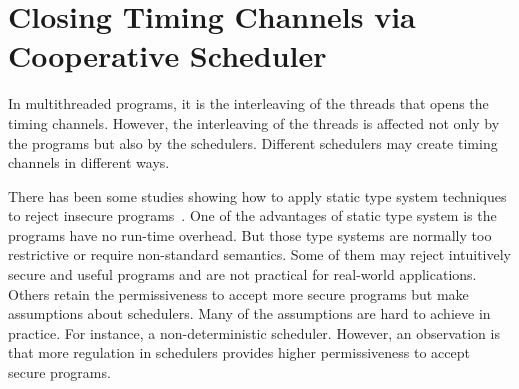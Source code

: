 \documentclass[a4paper]{report}
\newcommand{\co}[1]{$\cod{#1}$}
\begin{document}

\section{Closing Timing Channels via Cooperative Scheduler}
In multithreaded programs, it is the interleaving of the threads that opens the timing channels. 
However, the interleaving of the threads is affected not only by the programs but also by the schedulers.
Different schedulers may create timing channels in different ways.

There has been some studies showing how to apply static type system techniques to reject insecure
programs~\cite{Castellani:Boudol:TCS02,Volpano:Smith:Probabilistic,Zdancewic:Myers:CSFW03}. 
One of the advantages of static type system is the programs have no run-time overhead.
But those type systems are normally too restrictive or require non-standard semantics. 
Some of them may reject intuitively secure and useful programs and are not practical for
real-world applications.
Others retain the permissiveness to accept more secure programs but make assumptions about schedulers. 
Many of the assumptions are hard to achieve in practice. For instance, a non-deterministic scheduler.
However, an observation is that more regulation in schedulers provides higher permissiveness to accept secure
programs.
\end{document}
